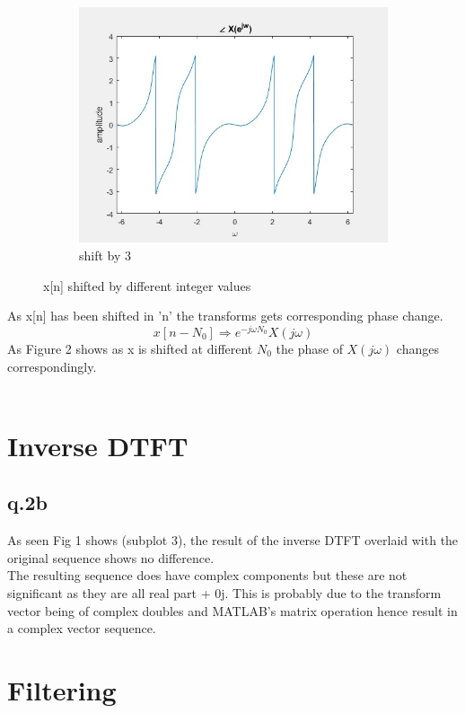\documentclass[11pt]{article}
\begin{document}
\begin{figure}[h]
\begin{subfigure}[b]{.3\linewidth}
\includegraphics[width=\linewidth]{forthabout0}
\caption{shift by 3}
\end{subfigure}\caption{x[n] shifted by different integer values}
\end{figure}

As x[n] has been shifted in 'n' the transforms gets corresponding phase change.
$$x[n - N_{0}] \Rightarrow e^{-j\omega N_{0}}X(j\omega)$$
As Figure 2 shows as x is shifted at different $N_{0}$ the phase of $X(j\omega)$ changes correspondingly.
\\ \\
\section{Inverse DTFT}
\subsection{q.2b}
As seen Fig 1 shows (subplot 3), the result of the inverse DTFT overlaid with the original sequence shows no difference.\\
The resulting sequence does have complex components but these are not significant as they are all real part + 0j. This is probably due to the transform vector being of complex doubles and MATLAB's matrix operation hence result in a complex vector sequence.

\newpage
\section{Filtering}
\end{document}
